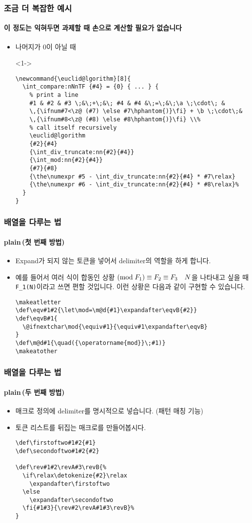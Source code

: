 \begin{frame}[fragile]
  \frametitle{조금 더 복잡한 예시}
  \framesubtitle{이 정도는 익혀두면 과제할 때 손으로 계산할 필요가 없습니다}
  \begin{itemize}
    \item<1-> 나머지가 0이 아닐 때
    \item[]<1-> \vspace{-1.5em}\begin{verbatim}
\newcommand{\euclid@lgorithm}[8]{
  \int_compare:nNnTF {#4} = {0} { ... } {
    % print a line
    #1 & #2 & #3 \;&\;+\;&\; #4 & #4 &\;=\;&\;\a \;\cdot\; &
    \,{\ifnum#7<\z@ (#7) \else #7\hphantom{)}\fi} + \b \;\cdot\;&
    \,{\ifnum#8<\z@ (#8) \else #8\hphantom{)}\fi} \\%
    % call itself recursively
    \euclid@lgorithm
    {#2}{#4}
    {\int_div_truncate:nn{#2}{#4}}
    {\int_mod:nn{#2}{#4}}
    {#7}{#8}
    {\the\numexpr #5 - \int_div_truncate:nn{#2}{#4} * #7\relax}
    {\the\numexpr #6 - \int_div_truncate:nn{#2}{#4} * #8\relax}% 
  }
}
    \end{verbatim}
  \end{itemize}
\end{frame}
\makeatletter
\def\eqv#1#2{\let\mod=\m@d{#1}\expandafter\eqvB{#2}}
\def\eqvB#1{
    \@ifnextchar\mod{\equiv#1}{\equiv#1\expandafter\eqvB}
}
\def\m@d#1{\quad({\operatorname{mod}}\;#1)}
\makeatother
\begin{frame}[fragile]
  \frametitle{배열을 다루는 법}
  \framesubtitle{plain\, (첫 번째 방법)}
  \begin{itemize}
    \item Expand가 되지 않는 토큰을 넣어서 delimiter의 역할을 하게 합니다.
    \item 예를 들어서 여러 식이 합동인 상황 $\eqv{F_1}{F_2}{F_3}\mod{N}$을 나타내고 싶을 때 \texttt{\eqv{F_1}{F_2}{F_3}\mod{N}}이라고 쓰면 편할 것입니다. 이런 상황은 다음과 같이 구현할 수 있습니다.
    \begin{verbatim}
\makeatletter
\def\eqv#1#2{\let\mod=\m@d{#1}\expandafter\eqvB{#2}}
\def\eqvB#1{
  \@ifnextchar\mod{\equiv#1}{\equiv#1\expandafter\eqvB}
}
\def\m@d#1{\quad({\operatorname{mod}}\;#1)}
\makeatother
    \end{verbatim}
  \end{itemize}
\end{frame}
\begin{frame}[fragile]
  \frametitle{배열을 다루는 법}
  \framesubtitle{plain\, (두 번째 방법)}
  \begin{itemize}
    \item 매크로 정의에 delimiter를 명시적으로 넣습니다. (패턴 매칭 기능)
    \item 토큰 리스트를 뒤집는 매크로를 만들어봅시다.
    \begin{verbatim}
\def\firstoftwo#1#2{#1}
\def\secondoftwo#1#2{#2}

\def\rev#1#2\revA#3\revB{%
  \if\relax\detokenize{#2}\relax
    \expandafter\firstoftwo
  \else
    \expandafter\secondoftwo
  \fi{#1#3}{\rev#2\revA#1#3\revB}%
}
    \end{verbatim}
  \end{itemize}
\end{frame}


